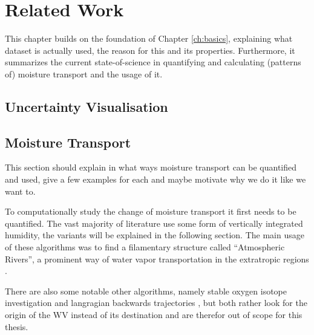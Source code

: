 \chapter{Related Work}
\label{ch:related_work}

This chapter builds on the foundation of Chapter \ref{ch:basics}, explaining what dataset is actually used, the reason for this and its properties. 
Furthermore, it summarizes the current state-of-science in quantifying and calculating (patterns of) moisture transport and the usage of it.  


\section{Uncertainty Visualisation}

\section{Moisture Transport}

This section should explain in what ways moisture transport can be quantified and used, give a few examples for each and maybe motivate  why we do it like we want to. 

To computationally study the change of moisture transport it first needs to be quantified. 
The vast majority of literature use some form of vertically integrated humidity, the variants will be explained in the following section.  
The main usage of these algorithms was to find a filamentary structure called \enquote{Atmospheric Rivers}, a prominent way of water vapor transportation in the extratropic regions \cite{gimeno_atmospheric_2014}. 



There are also some notable other algorithms, namely stable oxygen isotope investigation \cite{ma_atmospheric_nodate} and langragian backwards trajectories \cite{zhao_lagrangian_2021}, but both rather look for the origin of the WV instead of its destination and are therefor out of scope for this thesis.



